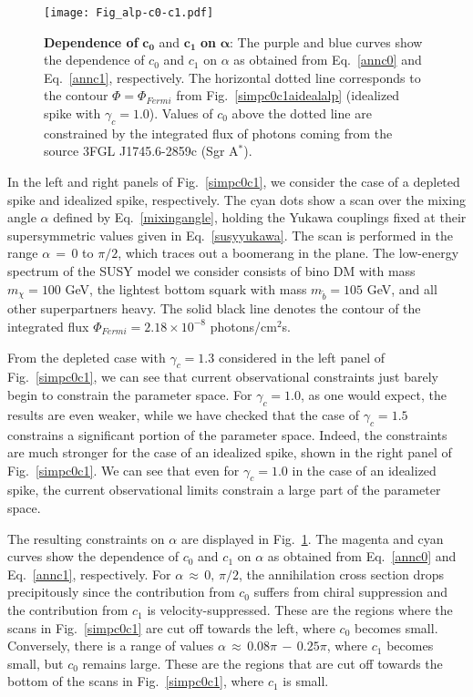 \documentclass[11pt]{article}
\begin{document}
\begin{figure}[ht]
  \centering
  {\texttt{[image: Fig\_alp-c0-c1.pdf]}}
    \caption{ \textbf{Dependence of} $\mathbf{c_0}$ and $\mathbf{c_1}$ \textbf{on} $\mathbf{\alpha}$: The purple and blue curves show the dependence of $c_0$ and $c_1$ on $\alpha$ as obtained from Eq.~\ref{annc0} and Eq.~\ref{annc1}, respectively. The horizontal dotted line corresponds to the contour $\Phi = \Phi_{Fermi}$ from Fig.~\ref{simpc0c1aidealalp} (idealized spike with $\gamma_c  = 1.0$). Values of $c_0$ above the dotted line are constrained by the integrated flux of photons coming from the source 3FGL J1745.6-2859c (Sgr A$^*$).}
    \label{alpdepc0c1}
\end{figure}


In the left and right panels of Fig.~\ref{simpc0c1}, we consider the case of a depleted spike and idealized spike, respectively. The cyan dots show a scan over the mixing angle $\alpha$  defined by Eq.~\ref{mixingangle}, holding the Yukawa couplings fixed at their supersymmetric values given in Eq.~\ref{susyyukawa}. The scan is performed in the range $\alpha \, = \, 0$ to $ \pi/2$, which traces out a boomerang in the plane.  The low-energy spectrum of the SUSY model we consider consists of bino DM with mass $m_{\chi} = 100$ GeV, the lightest bottom squark with mass $m_{\tilde{b}} = 105$ GeV, and all other superpartners heavy. The solid black line denotes the contour of the integrated flux $\Phi_{Fermi} = 2.18 \times 10^{-8}$ photons/cm$^2$s. 

From the depleted case with $\gamma_c = 1.3$ considered in the left panel of Fig.~\ref{simpc0c1}, we can see that current observational constraints just barely begin to constrain the parameter space. For $\gamma_c = 1.0$, as one would expect, the results are even weaker, while we have checked that the case of $\gamma_c = 1.5$ constrains a significant portion of the parameter space. Indeed, the constraints are much stronger for the case of an idealized spike, shown in the right panel of  Fig.~\ref{simpc0c1}. We can see that even for $\gamma_c = 1.0$ in the case of an idealized spike, the current observational limits constrain a large part of the parameter space.
 
The resulting constraints on $\alpha$ are displayed in Fig.~\ref{alpdepc0c1}. The magenta and cyan curves show the dependence of $c_0$ and $c_1$ on $\alpha$ as obtained from Eq.~\ref{annc0} and Eq.~\ref{annc1}, respectively. For $\alpha \, \approx \, 0 , \, \pi/2$, the annihilation cross section drops precipitously since the contribution from $c_0$ suffers from chiral suppression and the contribution from $c_1$ is velocity-suppressed. These are the regions where the scans in Fig.~\ref{simpc0c1} are cut off towards the left, where $c_0$ becomes small. Conversely, there is a range of values $\alpha \, \approx \, 0.08 \pi \, - \, 0.25 \pi$, where $c_1$ becomes small, but $c_0$ remains large. These are the regions that are cut off towards the bottom of the scans in Fig.~\ref{simpc0c1}, where $c_1$ is small. 
\end{document}
